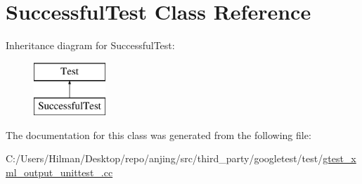 \hypertarget{class_successful_test}{}\section{Successful\+Test Class Reference}
\label{class_successful_test}
Inheritance diagram for Successful\+Test\+:\begin{figure}[H]
\begin{center}
\leavevmode
\includegraphics[height=2.000000cm]{class_successful_test}
\end{center}
\end{figure}


The documentation for this class was generated from the following file\+:\begin{DoxyCompactItemize}
\item 
C\+:/\+Users/\+Hilman/\+Desktop/repo/anjing/src/third\+\_\+party/googletest/test/\hyperlink{gtest__xml__output__unittest___8cc}{gtest\+\_\+xml\+\_\+output\+\_\+unittest\+\_\+.\+cc}\end{DoxyCompactItemize}
